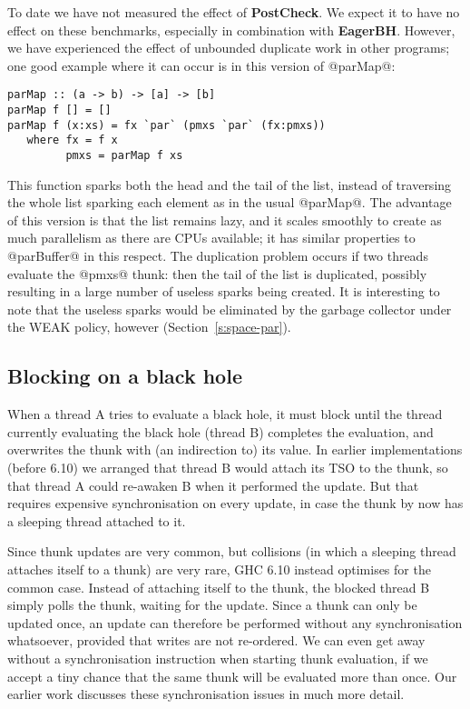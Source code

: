 \documentclass[twocolumn,9pt]{sigplanconf}
\begin{document}
To date we have not measured the effect of \textbf{PostCheck}.  We
expect it to have no effect on these benchmarks, especially in
combination with \textbf{EagerBH}.  However, we have experienced the
effect of unbounded duplicate work in other programs; one good example
where it can occur is in this version of @parMap@:

\begin{verbatim}
parMap :: (a -> b) -> [a] -> [b]
parMap f [] = []
parMap f (x:xs) = fx `par` (pmxs `par` (fx:pmxs))
   where fx = f x
         pmxs = parMap f xs
\end{verbatim}
This function sparks both the head and the tail of the list, instead
of traversing the whole list sparking each element as in the usual
@parMap@.  The advantage of this version is that the list remains
lazy, and it scales smoothly to create as much parallelism as there
are CPUs available; it has similar properties to @parBuffer@ in this
respect.  The duplication problem occurs if two threads evaluate the
@pmxs@ thunk: then the tail of the list is duplicated, possibly
resulting in a large number of useless sparks being created.  It is
interesting to note that the useless sparks would be eliminated by the
garbage collector under the WEAK policy, however
(Section~\ref{s:space-par}).

\subsection{Blocking on a black hole}
\label{s:blocking-on-blackholes}

When a thread A tries to evaluate a black hole, it must block until
the thread currently evaluating the black hole (thread B) completes the
evaluation, and overwrites the thunk with (an indirection to) its
value.  In earlier implementations (before 6.10) we arranged that thread B would
attach its TSO to the thunk, so that thread A could re-awaken B when
it performed the update.  But that requires expensive synchronisation
on every update, in case the thunk by now has a sleeping thread
attached to it.

Since thunk updates are very common, but collisions (in which a
sleeping thread attaches itself to a thunk) are very rare, GHC 6.10 instead
optimises for the common case.  Instead of attaching itself to the
thunk, the blocked thread B simply polls the thunk, waiting for the
update.  Since a thunk can only be updated once, an update can
therefore be performed without any synchronisation whatsoever,
provided that writes are not re-ordered. We can even get away without
a synchronisation instruction when starting thunk evaluation, if we
accept a tiny chance that the same thunk will be evaluated more than
once.  Our earlier work \cite{multiproc05} discusses these
synchronisation issues in much more detail.
\end{document}
